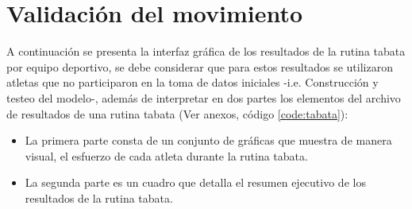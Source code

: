 \section{Validaci\'on del movimiento} \label{res:valResults}
A continuaci\'on se presenta la interfaz gr\'afica de los resultados de la rutina tabata por equipo deportivo, se debe considerar que para estos resultados se utilizaron atletas que no participaron en la toma de datos iniciales -i.e. Construcci\'on y testeo del modelo-, adem\'as de interpretar en dos partes los elementos del archivo de resultados de una rutina tabata (Ver anexos, c\'odigo \ref{code:tabata}):
\begin{itemize}
\item La primera parte consta de un conjunto de gr\'aficas que muestra de manera visual, el esfuerzo  de cada atleta durante la rutina tabata.
\item La segunda parte es un cuadro que detalla el  resumen ejecutivo de los resultados de la rutina tabata.
\end{itemize}
